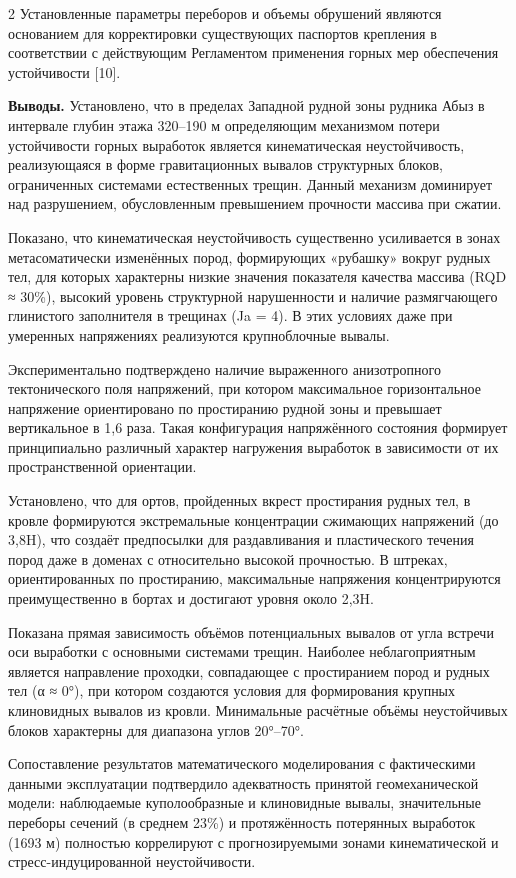 \begin{multicols}{2}
Установленные параметры переборов и объемы обрушений являются основанием
для корректировки существующих паспортов крепления в соответствии с
действующим Регламентом применения горных мер обеспечения устойчивости
{[}10{]}.

{\bfseries Выводы.} Установлено, что в пределах Западной рудной зоны
рудника Абыз в интервале глубин этажа 320--190 м определяющим механизмом
потери устойчивости горных выработок является кинематическая
неустойчивость, реализующаяся в форме гравитационных вывалов структурных
блоков, ограниченных системами естественных трещин. Данный механизм
доминирует над разрушением, обусловленным превышением прочности массива
при сжатии.

Показано, что кинематическая неустойчивость существенно усиливается в
зонах метасоматически изменённых пород, формирующих «рубашку» вокруг
рудных тел, для которых характерны низкие значения показателя качества
массива (RQD ≈ 30\%), высокий уровень структурной нарушенности и наличие
размягчающего глинистого заполнителя в трещинах (Ja = 4). В этих
условиях даже при умеренных напряжениях реализуются крупноблочные
вывалы.

Экспериментально подтверждено наличие выраженного анизотропного
тектонического поля напряжений, при котором максимальное горизонтальное
напряжение ориентировано по простиранию рудной зоны и превышает
вертикальное в 1,6 раза. Такая конфигурация напряжённого состояния
формирует принципиально различный характер нагружения выработок в
зависимости от их пространственной ориентации.

Установлено, что для ортов, пройденных вкрест простирания рудных тел, в
кровле формируются экстремальные концентрации сжимающих напряжений (до
3,8H), что создаёт предпосылки для раздавливания и пластического течения
пород даже в доменах с относительно высокой прочностью. В штреках,
ориентированных по простиранию, максимальные напряжения концентрируются
преимущественно в бортах и достигают уровня около 2,3H.

Показана прямая зависимость объёмов потенциальных вывалов от угла
встречи оси выработки с основными системами трещин. Наиболее
неблагоприятным является направление проходки, совпадающее с
простиранием пород и рудных тел (α ≈ 0°), при котором создаются условия
для формирования крупных клиновидных вывалов из кровли. Минимальные
расчётные объёмы неустойчивых блоков характерны для диапазона углов
20°--70°.

Сопоставление результатов математического моделирования с фактическими
данными эксплуатации подтвердило адекватность принятой геомеханической
модели: наблюдаемые куполообразные и клиновидные вывалы, значительные
переборы сечений (в среднем 23\%) и протяжённость потерянных выработок
(1693 м) полностью коррелируют с прогнозируемыми зонами кинематической и
стресс-индуцированной неустойчивости.


\end{multicols}
